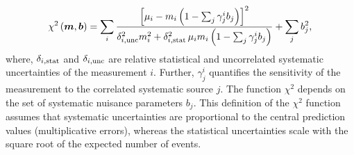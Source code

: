 \begin{description}
\begin{equation} 
    \chi^2\left(\boldsymbol{m},\boldsymbol{b}\right) =   
 \sum_i \frac{\left[ {\mu_i} - m_i \left( 1 - \sum_j \gamma^i_j b_j \right) \right]^2}
{ \textstyle \delta^2_{i,{\rm unc}}m_i^2 + \delta^2_{i,{\rm stat}}\, {\mu_i} m_i \left(1 - \sum_j \gamma^i_j b_j\right) }
  + \sum_j b^2_j,
\label{eq:aven}
\end{equation}
%
where, $\delta_{i,\rm stat}$ and $\delta_{i,\rm unc}$ are 
relative statistical and uncorrelated systematic uncertainties
of the measurement $i$.
Further, $\gamma^i_j$ quantifies the sensitivity of the
measurement to the correlated systematic source $j$. 
The function $\chi^2$ depends on
 the set of systematic nuisance parameters $b_j$.
This definition of the $\chi^2$ function assumes that
systematic uncertainties are proportional to the central prediction values
(multiplicative errors), whereas the statistical uncertainties scale 
with the square root of the expected number of events. 


\end{description}

